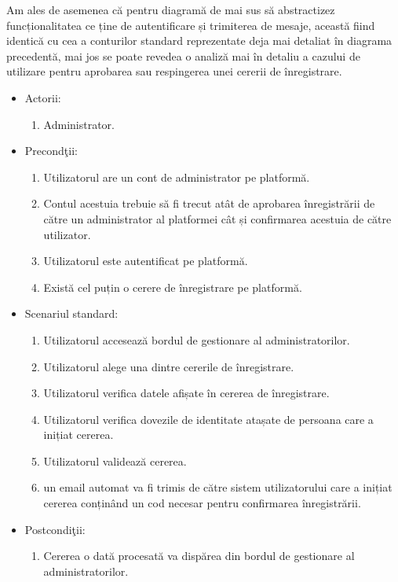 \documentclass[12pt,a4paper,hidelinks]{report}
\theoremstyle{definition}
\theoremstyle{remark}
\begin{document}
Am ales de asemenea că pentru diagramă de mai sus să abstractizez funcționalitatea ce ține de autentificare și trimiterea de mesaje, această fiind identică cu cea a conturilor standard reprezentate deja mai detaliat în diagrama precedentă, mai jos se poate revedea o analiză mai în detaliu a cazului de utilizare pentru aprobarea sau respingerea unei cererii de înregistrare.
\begin{itemize}
    \item {Actorii:
        \begin{enumerate}
            \item Administrator.
        \end{enumerate}}
    \item {Precond\c tii:
        \begin{enumerate}
            \item Utilizatorul are un cont de administrator pe platformă.
            \item Contul acestuia trebuie să fi trecut atât de aprobarea înregistrării de către un administrator al platformei cât și confirmarea acestuia de către utilizator.
            \item Utilizatorul este autentificat pe platformă.
            \item Există cel puțin o cerere de înregistrare pe platformă.
        \end{enumerate}}
    \item {Scenariul standard:
        \begin{enumerate}
            \item Utilizatorul accesează bordul de gestionare al administratorilor.
            \item Utilizatorul alege una dintre cererile de înregistrare.
            \item Utilizatorul verifica datele afișate în cererea de înregistrare.
            \item Utilizatorul verifica dovezile de identitate atașate de persoana care a inițiat cererea.
            \item Utilizatorul validează cererea.
            \item un email automat va fi trimis de către sistem utilizatorului care a inițiat cererea conținând un cod necesar pentru confirmarea înregistrării.    
        \end{enumerate}}
    \item {Postcondi\c tii:
        \begin{enumerate}
            \item Cererea o dată procesată va dispărea din bordul de gestionare al administratorilor.

\end{enumerate}}
\end{itemize}
\end{document}
